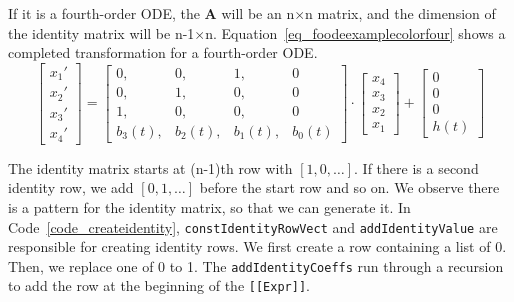 If it is a fourth-order ODE, the \textbf{A} will be an n$\times$n matrix, and the dimension of the identity matrix will be n-1$\times$n. Equation~\ref{eq_foodeexamplecolorfour} shows a completed transformation for a fourth-order ODE.
\begin{equation} \label{eq_foodeexamplecolorfour}
	\begin{bmatrix}
		{x_{1}'} \\
    {x_{2}'} \\
    {x_{3}'} \\
    {x_{4}'}
	\end{bmatrix}
    = 
  \begin{bmatrix}
		{0}, & {0}, & {1}, & {0} \\
    {0}, & {1}, & {0}, & {0} \\
    {1}, & {0}, & {0}, & {0} \\
    {b_{3}(t)}, & {b_{2}(t)}, & {b_{1}(t)}, & {b_{0}(t)}
	\end{bmatrix}
    \cdot
  \begin{bmatrix}
		{x_{4}} \\
    {x_{3}} \\
    {x_{2}} \\
    {x_{1}}
	\end{bmatrix}
    + 
  \begin{bmatrix}
    {0} \\
    {0} \\
    {0} \\
    {h(t)}
	\end{bmatrix}
\end{equation}

The identity matrix starts at (n-1)th row with $[1, 0, \dots]$. If there is a second identity row, we add $[0, 1, \dots]$ before the start row and so on. We observe there is a pattern for the identity matrix, so that we can generate it. In Code~\ref{code_createidentity}, \verb|constIdentityRowVect| and \verb|addIdentityValue| are responsible for creating identity rows. We first create a row containing a list of 0. Then, we replace one of 0 to 1. The \verb|addIdentityCoeffs| run through a recursion to add the row at the beginning of the \verb|[[Expr]]|.

